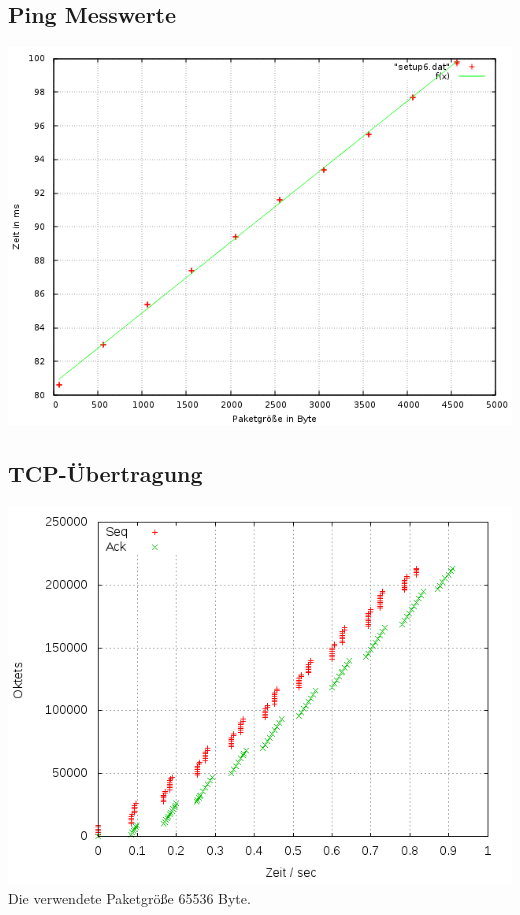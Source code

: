 \documentclass[a4paper,10pt]{article}
\begin{document}
\subsection{Ping Messwerte}
\includegraphics[scale=0.75]{ping_setup_wan4.png}

\subsection{TCP-Übertragung}
\includegraphics[scale=0.75]{setup_wan4.png}
Die verwendete Paketgröße 65536 Byte.
\end{document}
